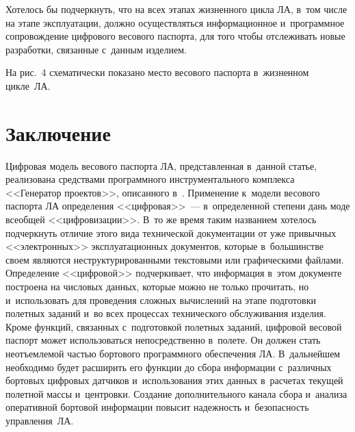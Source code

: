 \begin{multicols}{2}
  Хотелось бы подчеркнуть, что на всех этапах жизненного цикла ЛА, в~том 
числе на этапе эксплуатации, должно осуществляться информационное 
и~программное сопровождение цифрового весового паспорта, для того чтобы 
отслеживать новые разработки, связанные с~данным изделием. 
  
  На рис.~4 схематически показано место весового паспорта в~жизненном 
цик\-ле~ЛА.
  



\vspace{-12pt}

\section{Заключение}

\vspace*{-2pt}

  Цифровая модель весового паспорта ЛА, представленная в~данной статье, 
реализована средствами программного инструментального комплекса 
<<Генератор проектов>>, описанного в~\cite{3-f}.
  Применение к~модели весового паспорта ЛА определения <<цифровая>>~--- 
в~определенной степени дань моде всеобщей <<цифровизации>>. В~то же 
время таким названием хотелось подчеркнуть отличие этого вида технической 
документации от уже привычных <<электронных>> эксплуатационных 
документов, которые в~большинстве своем являются неструктурированными 
текстовыми или графическими файлами. Определение <<цифровой>> 
подчеркивает, что информация в~этом документе построена на числовых 
данных, которые можно не только прочитать, но и~использовать для 
проведения сложных вычислений на этапе подготовки полетных заданий и~во 
всех процессах технического обслуживания изделия.
  Кроме функций, связанных с~подготовкой полетных заданий, цифровой 
весовой паспорт может использоваться непосредственно в~полете. Он должен 
стать неотъемлемой частью бортового программного обеспечения ЛА. 
В~дальнейшем необходимо будет расширить его функции до сбора 
информации с~различных бортовых цифровых датчиков и~использования этих 
данных в~расчетах текущей полетной массы и~центровки. Создание 
дополнительного канала сбора и~анализа оперативной бортовой информации 
повысит надежность и~безопас\-ность управ\-ле\-ния~ЛА. 

\vspace{-6pt}
  

\end{multicols}
